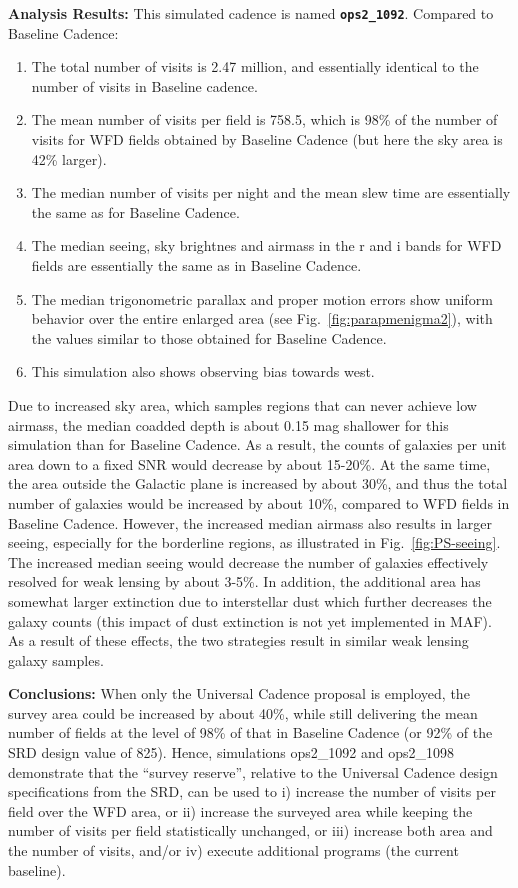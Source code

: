 \documentclass[manuscript]{article}
\begin{document}
{\bf Analysis Results:}  This simulated cadence is named \texttt{\bf ops2\_1092}. Compared
to Baseline Cadence:
\begin{enumerate}
\item The total number of visits is 2.47 million, and essentially identical to the 
number of visits in Baseline cadence. 
\item
The mean number of visits per field is 758.5, which is 98\% of the number of visits
for WFD fields obtained by Baseline Cadence (but here the sky area is 42\% larger). 
\item The median number of visits per night and the mean slew time are 
essentially the same as for Baseline Cadence. 
\item The median seeing, sky brightnes and airmass in the r and i bands for WFD fields are 
         essentially the same as in Baseline Cadence. 
\item The median trigonometric parallax and proper motion errors show
uniform behavior over the entire enlarged area (see Fig.~\ref{fig:parapmenigma2}),
with the values similar to those obtained for Baseline Cadence. 
\item This simulation also shows observing bias towards west. 
\end{enumerate}

Due to increased sky area, which samples regions that can never achieve low airmass,
the median coadded depth is about 0.15 mag shallower for this simulation than
for Baseline Cadence. As a result, the counts of galaxies per unit area down to a 
fixed SNR would decrease by about 15-20\%. At the same time, the area outside 
the Galactic plane is increased by about 30\%, and thus the total number of galaxies
would be increased by about 10\%, compared to WFD fields in Baseline Cadence. 
However, the increased median airmass also results in larger seeing, especially
for the borderline regions, as illustrated in Fig.~\ref{fig:PS-seeing}. The increased
median seeing would decrease the number of galaxies effectively resolved for
weak lensing by about 3-5\%. In addition, the additional area has somewhat larger 
extinction due to interstellar dust which further decreases the galaxy counts (this
impact of dust extinction is not yet implemented in MAF). As a result of these
effects, the two strategies result in similar weak lensing galaxy samples. 

{\bf Conclusions:} When only the Universal Cadence proposal is employed, the survey area
could be increased by about 40\%, while still delivering the mean number of fields at
the level of 98\% of that in Baseline Cadence (or 92\% of the SRD design value of 825). 
Hence, simulations ops2\_1092  and ops2\_1098 demonstrate that the ``survey reserve'', 
relative to the Universal Cadence design specifications from the SRD, can be used to
i) increase the number of visits per field over the WFD area,  or 
ii) increase the surveyed area while keeping the number of visits per field statistically unchanged, or 
iii) increase both area and the number of visits, and/or  
iv) execute additional programs (the current baseline). 
\end{document}
